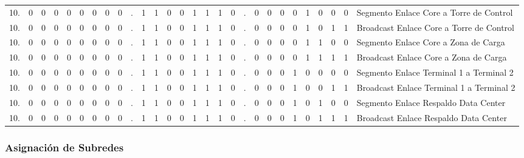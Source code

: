 \begin{center}
{\begin{tabular}{r cccccccc c cccccccc c cccccccc l}
10. & 0 & 0 & 0 & 0 & 0 & 0 & 0 & 0 & . & 1 & 1 & 0 & 0 & 1 & 1 & 1 & 0 & . & 0 & 0 & 0 & 0 & 1 & \multicolumn{1}{c|}{0} & 0 & 0 & Segmento Enlace Core a Torre de Control \\
10. & 0 & 0 & 0 & 0 & 0 & 0 & 0 & 0 & . & 1 & 1 & 0 & 0 & 1 & 1 & 1 & 0 & . & 0 & 0 & 0 & 0 & 1 & \multicolumn{1}{c|}{0} & 1 & 1 & Broadcast Enlace Core a Torre de Control \\
\addlinespace

10. & 0 & 0 & 0 & 0 & 0 & 0 & 0 & 0 & . & 1 & 1 & 0 & 0 & 1 & 1 & 1 & 0 & . & 0 & 0 & 0 & 0 & 1 & \multicolumn{1}{c|}{1} & 0 & 0 & Segmento Enlace Core a Zona de Carga \\
10. & 0 & 0 & 0 & 0 & 0 & 0 & 0 & 0 & . & 1 & 1 & 0 & 0 & 1 & 1 & 1 & 0 & . & 0 & 0 & 0 & 0 & 1 & \multicolumn{1}{c|}{1} & 1 & 1 & Broadcast Enlace Core a Zona de Carga \\
\addlinespace

10. & 0 & 0 & 0 & 0 & 0 & 0 & 0 & 0 & . & 1 & 1 & 0 & 0 & 1 & 1 & 1 & 0 & . & 0 & 0 & 0 & 1 & 0 & \multicolumn{1}{c|}{0} & 0 & 0 & Segmento Enlace Terminal 1 a Terminal 2 \\
10. & 0 & 0 & 0 & 0 & 0 & 0 & 0 & 0 & . & 1 & 1 & 0 & 0 & 1 & 1 & 1 & 0 & . & 0 & 0 & 0 & 1 & 0 & \multicolumn{1}{c|}{0} & 1 & 1 & Broadcast Enlace Terminal 1 a Terminal 2 \\
\addlinespace

10. & 0 & 0 & 0 & 0 & 0 & 0 & 0 & 0 & . & 1 & 1 & 0 & 0 & 1 & 1 & 1 & 0 & . & 0 & 0 & 0 & 1 & 0 & \multicolumn{1}{c|}{1} & 0 & 0 & Segmento Enlace Respaldo Data Center \\
10. & 0 & 0 & 0 & 0 & 0 & 0 & 0 & 0 & . & 1 & 1 & 0 & 0 & 1 & 1 & 1 & 0 & . & 0 & 0 & 0 & 1 & 0 & \multicolumn{1}{c|}{1} & 1 & 1 & Broadcast Enlace Respaldo Data Center \\
\bottomrule
\end{tabular}
}
\end{center}
\vspace{15pt}

\subsubsection*{Asignación de Subredes}

